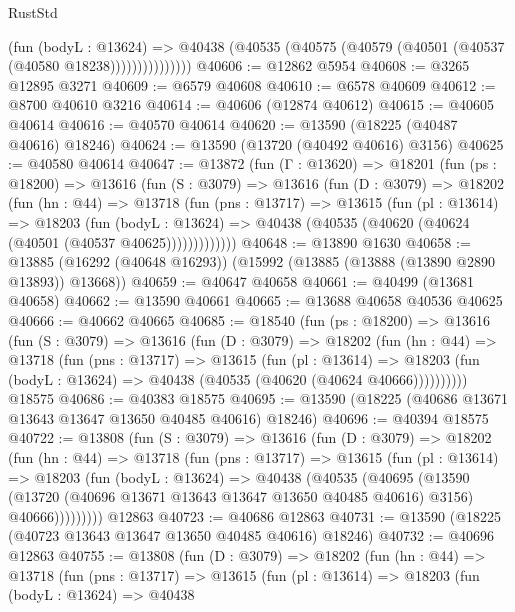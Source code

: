 \begin{lexlean}{RustStd}
\begin{coremodule}
                    (fun (bodyL : @13624) =>
                    @40438 (@40535 (@40575 (@40579 (@40501 (@40537 (@40580 @18238)))))))))))))))
@40606 := @12862 @5954
@40608 := @3265 @12895 @3271
@40609 := @6579 @40608
@40610 := @6578 @40609
@40612 := @8700 @40610 @3216
@40614 := @40606 (@12874 @40612)
@40615 := @40605 @40614
@40616 := @40570 @40614
@40620 := @13590 (@18225 (@40487 @40616) @18246)
@40624 := @13590 (@13720 (@40492 @40616) @3156)
@40625 := @40580 @40614
@40647 := @13872
    (fun (Γ : @13620) =>
    @18201
      (fun (ps : @18200) =>
      @13616
        (fun (S : @3079) =>
        @13616
          (fun (D : @3079) =>
          @18202
            (fun (hn : @44) =>
            @13718
              (fun (pns : @13717) =>
              @13615
                (fun (pl : @13614) =>
                @18203
                  (fun (bodyL : @13624) =>
                  @40438 (@40535 (@40620 (@40624 (@40501 (@40537 @40625)))))))))))))
@40648 := @13890 @1630
@40658 := @13885 (@16292 (@40648 @16293)) (@15992 (@13885 (@13888 (@13890 @2890 @13893)) @13668))
@40659 := @40647 @40658
@40661 := @40499 (@13681 @40658)
@40662 := @13590 @40661
@40665 := @13688 @40658 @40536 @40625
@40666 := @40662 @40665
@40685 := @18540
    (fun (ps : @18200) =>
    @13616
      (fun (S : @3079) =>
      @13616
        (fun (D : @3079) =>
        @18202
          (fun (hn : @44) =>
          @13718
            (fun (pns : @13717) =>
            @13615
              (fun (pl : @13614) =>
              @18203 (fun (bodyL : @13624) => @40438 (@40535 (@40620 (@40624 @40666))))))))))
    @18575
@40686 := @40383 @18575
@40695 := @13590 (@18225 (@40686 @13671 @13643 @13647 @13650 @40485 @40616) @18246)
@40696 := @40394 @18575
@40722 := @13808
    (fun (S : @3079) =>
    @13616
      (fun (D : @3079) =>
      @18202
        (fun (hn : @44) =>
        @13718
          (fun (pns : @13717) =>
          @13615
            (fun (pl : @13614) =>
            @18203
              (fun (bodyL : @13624) =>
              @40438
                (@40535
                  (@40695
                    (@13590
                      (@13720 (@40696 @13671 @13643 @13647 @13650 @40485 @40616) @3156)
                      @40666)))))))))
    @12863
@40723 := @40686 @12863
@40731 := @13590 (@18225 (@40723 @13643 @13647 @13650 @40485 @40616) @18246)
@40732 := @40696 @12863
@40755 := @13808
    (fun (D : @3079) =>
    @18202
      (fun (hn : @44) =>
      @13718
        (fun (pns : @13717) =>
        @13615
          (fun (pl : @13614) =>
          @18203
            (fun (bodyL : @13624) =>
            @40438

\end{coremodule}
\end{lexlean}
